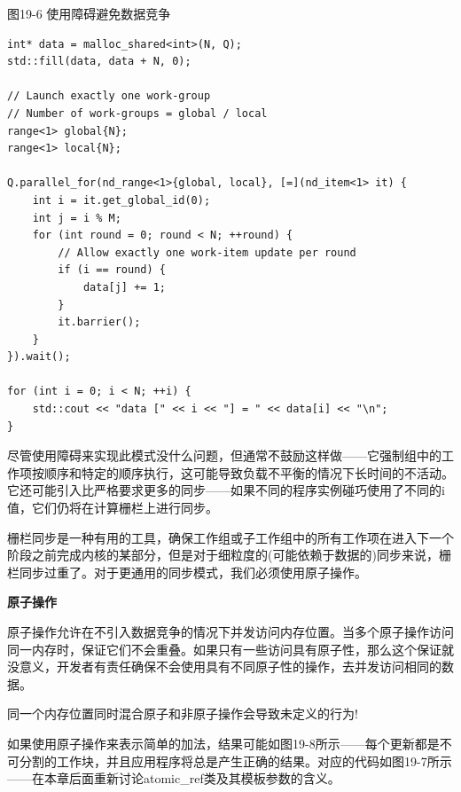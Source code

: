 \hspace*{\fill} \par %
图19-6 使用障碍避免数据竞争
\begin{lstlisting}[caption={}]
int* data = malloc_shared<int>(N, Q);
std::fill(data, data + N, 0);

// Launch exactly one work-group
// Number of work-groups = global / local
range<1> global{N};
range<1> local{N};

Q.parallel_for(nd_range<1>{global, local}, [=](nd_item<1> it) {
	int i = it.get_global_id(0);
	int j = i % M;
	for (int round = 0; round < N; ++round) {
		// Allow exactly one work-item update per round
		if (i == round) {
			data[j] += 1;
		}
		it.barrier();
	}
}).wait();

for (int i = 0; i < N; ++i) {
	std::cout << "data [" << i << "] = " << data[i] << "\n";
}
\end{lstlisting}

尽管使用障碍来实现此模式没什么问题，但通常不鼓励这样做——它强制组中的工作项按顺序和特定的顺序执行，这可能导致负载不平衡的情况下长时间的不活动。它还可能引入比严格要求更多的同步——如果不同的程序实例碰巧使用了不同的i值，它们仍将在计算栅栏上进行同步。\par

栅栏同步是一种有用的工具，确保工作组或子工作组中的所有工作项在进入下一个阶段之前完成内核的某部分，但是对于细粒度的(可能依赖于数据的)同步来说，栅栏同步过重了。对于更通用的同步模式，我们必须使用原子操作。\par

\hspace*{\fill} \par %
\textbf{原子操作}

原子操作允许在不引入数据竞争的情况下并发访问内存位置。当多个原子操作访问同一内存时，保证它们不会重叠。如果只有一些访问具有原子性，那么这个保证就没意义，开发者有责任确保不会使用具有不同原子性的操作，去并发访问相同的数据。\par

\begin{tcolorbox}[colback=red!5!white,colframe=red!75!black]
同一个内存位置同时混合原子和非原子操作会导致未定义的行为!
\end{tcolorbox}

如果使用原子操作来表示简单的加法，结果可能如图19-8所示——每个更新都是不可分割的工作块，并且应用程序将总是产生正确的结果。对应的代码如图19-7所示——在本章后面重新讨论atomic\_ref类及其模板参数的含义。\par

